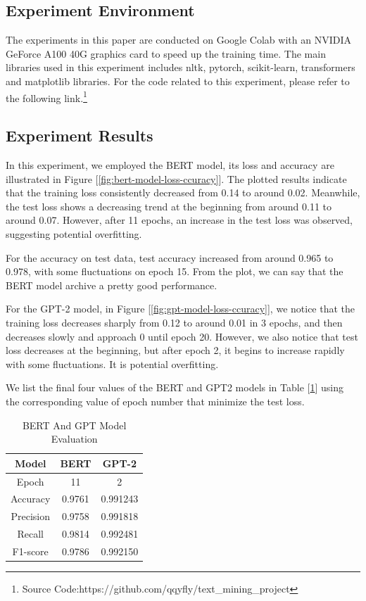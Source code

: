 
\subsection{Experiment Environment}



The experiments in this paper are conducted on Google Colab\cite{google_colab} with an NVIDIA GeForce A100 40G graphics card to speed up the training time. The main libraries used in this experiment includes nltk, pytorch, scikit-learn, transformers and matplotlib libraries.
For the code related to this experiment, please refer to the following link.\footnote{Source Code:https://github.com/qqyfly/text\_mining\_project} 

\subsection{Experiment Results}

In this experiment, we employed the BERT model, its loss and accuracy are illustrated in Figure [\ref{fig:bert-model-loss-ccuracy}]. The plotted results indicate that the training loss consistently decreased from 0.14 to around 0.02. Meanwhile, the test loss shows a decreasing trend at the beginning from around 0.11 to around 0.07. However, after 11 epochs, an increase in the test loss was observed, suggesting potential overfitting.

For the accuracy on test data, test accuracy increased from around 0.965 to 0.978, with some fluctuations on epoch 15. From the plot, we can say that the BERT model archive a pretty good performance.

For the GPT-2 model, in Figure [\ref{fig:gpt-model-loss-ccuracy}], we notice that the training loss decreases sharply from 0.12 to around 0.01 in 3 epochs, and then decreases slowly and approach 0 until epoch 20. However, we also notice that test loss decreases at the beginning, but after epoch 2, it begins to increase rapidly with some fluctuations. It is potential overfitting.



We list the final four values of the BERT and GPT2 models in Table [\ref{table:bert-gpt-evalution}] using the corresponding value of epoch number that minimize the test loss.

\begin{table}
    \centering 
    \begin{tabular}{|c|c|c|}
        \hline
        \textbf{Model} & \textbf{BERT} & \textbf{GPT-2} \\
        \hline
        Epoch & 11 & 2\\
        \hline
        Accuracy & 0.9761 & 0.991243\\
        \hline
        Precision & 0.9758 & 0.991818\\
        \hline
        Recall & 0.9814 & 0.992481\\
        \hline
        F1-score & 0.9786  & 0.992150\\
        \hline
    \end{tabular}
    \caption{BERT And GPT Model Evaluation}
    \label{table:bert-gpt-evalution}
\end{table}



